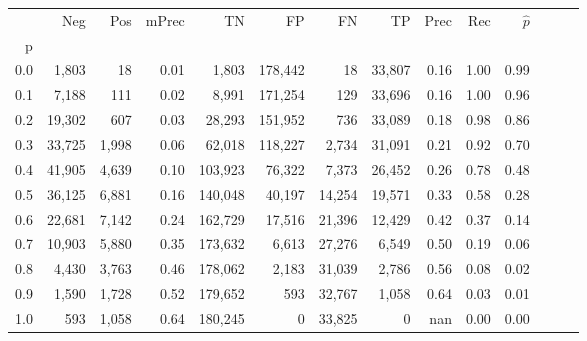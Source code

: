 \begin{tabular}{rrrrrrrrrrrrrr}
\toprule
{} &     Neg &    Pos & mPrec &       TN &       FP &      FN &      TP &  Prec &   Rec & $\hat{p}$ \\
p   &         &        &       &          &          &         &         &       &       &           \\
\midrule
0.0 &   1,803 &     18 &  0.01 &    1,803 &  178,442 &      18 &  33,807 &  0.16 &  1.00 &      0.99 \\
0.1 &   7,188 &    111 &  0.02 &    8,991 &  171,254 &     129 &  33,696 &  0.16 &  1.00 &      0.96 \\
0.2 &  19,302 &    607 &  0.03 &   28,293 &  151,952 &     736 &  33,089 &  0.18 &  0.98 &      0.86 \\
0.3 &  33,725 &  1,998 &  0.06 &   62,018 &  118,227 &   2,734 &  31,091 &  0.21 &  0.92 &      0.70 \\
0.4 &  41,905 &  4,639 &  0.10 &  103,923 &   76,322 &   7,373 &  26,452 &  0.26 &  0.78 &      0.48 \\
0.5 &  36,125 &  6,881 &  0.16 &  140,048 &   40,197 &  14,254 &  19,571 &  0.33 &  0.58 &      0.28 \\
0.6 &  22,681 &  7,142 &  0.24 &  162,729 &   17,516 &  21,396 &  12,429 &  0.42 &  0.37 &      0.14 \\
0.7 &  10,903 &  5,880 &  0.35 &  173,632 &    6,613 &  27,276 &   6,549 &  0.50 &  0.19 &      0.06 \\
0.8 &   4,430 &  3,763 &  0.46 &  178,062 &    2,183 &  31,039 &   2,786 &  0.56 &  0.08 &      0.02 \\
0.9 &   1,590 &  1,728 &  0.52 &  179,652 &      593 &  32,767 &   1,058 &  0.64 &  0.03 &      0.01 \\
1.0 &     593 &  1,058 &  0.64 &  180,245 &        0 &  33,825 &       0 &   nan &  0.00 &      0.00 \\
\bottomrule
\end{tabular}
